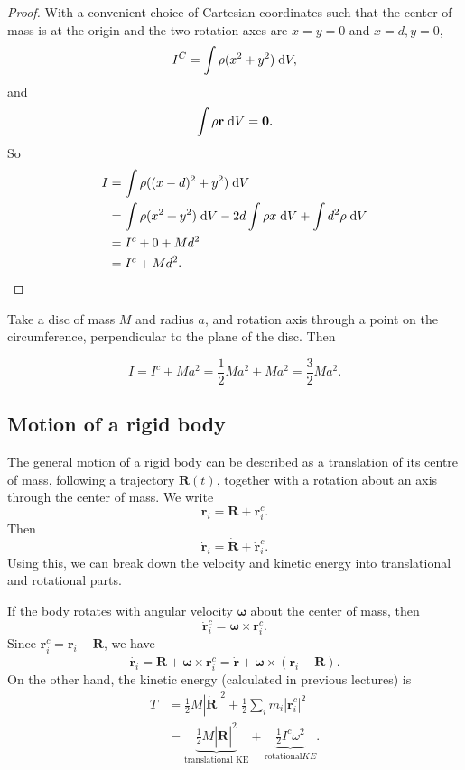 \documentclass[a4paper]{article}
\begin{document}
\begin{proof}
  With a convenient choice of Cartesian coordinates such that the center of mass is at the origin and the two rotation axes are $x = y =0$ and $x = d, y = 0$,
  \[
    I^C = \int \rho (x^2 + y^2) \;\mathrm{d} V,
  \]
  and
  \[
    \int \rho \mathbf{r}\;\mathrm{d} V = \mathbf{0}.
  \]
  So
  \begin{align*}
    I &= \int \rho((x - d)^2 + y^2)\;\mathrm{d} V\\
    &=\int \rho (x^2 + y^2)\;\mathrm{d} V - 2d\int \rho x\;\mathrm{d} V + \int d^2 \rho\;\mathrm{d} V\\
    &= I^c + 0 + Md^2\\
    &= I^c + Md^2.
  \end{align*}
\end{proof}

\begin{eg}
  Take a disc of mass $M$ and radius $a$, and rotation axis through a point on the circumference, perpendicular to the plane of the disc. Then
  \begin{center}
  \end{center}
  \[
    I = I^c + Ma^2 = \frac{1}{2}Ma^2 + Ma^2 = \frac{3}{2}Ma^2.
  \]
\end{eg}

\subsection{Motion of a rigid body}
The general motion of a rigid body can be described as a translation of its centre of mass, following a trajectory $\mathbf{R}(t)$, together with a rotation about an axis through the center of mass. We write
\[
  \mathbf{r}_i = \mathbf{R} + \mathbf{r}_i^c.
\]
Then
\[
  \dot{\mathbf{r}}_i = \dot{\mathbf{R}} + \dot{\mathbf{r}}_i^c.
\]
Using this, we can break down the velocity and kinetic energy into translational and rotational parts.

If the body rotates with angular velocity $\boldsymbol\omega$ about the center of mass, then
\[
  \dot{\mathbf{r}}_i^c = \boldsymbol\omega \times \mathbf{r}_i^c.
\]
Since $\mathbf{r}_i^c = \mathbf{r}_i - \mathbf{R}$, we have
\[
  \dot{\mathbf{r}_i} = \dot{\mathbf{R}} + \boldsymbol \omega \times \mathbf{r}_i^c = \dot{\mathbf{r}} + \boldsymbol\omega\times (\mathbf{r}_i - \mathbf{R}).
\]
On the other hand, the kinetic energy (calculated in previous lectures) is
\begin{align*}
  T &= \frac{1}{2}M|\dot{\mathbf{R}}|^2 + \frac{1}{2}\sum_i m_i |\dot{\mathbf{r}}_i^c|^2\\
  &= \underbrace{\frac{1}{2}M|\dot{\mathbf{R}}|^2}_{\text{translational KE}} + \underbrace{\frac{1}{2}I^c\omega^2}_{\text{rotational} KE}.
\end{align*}
\end{document}
